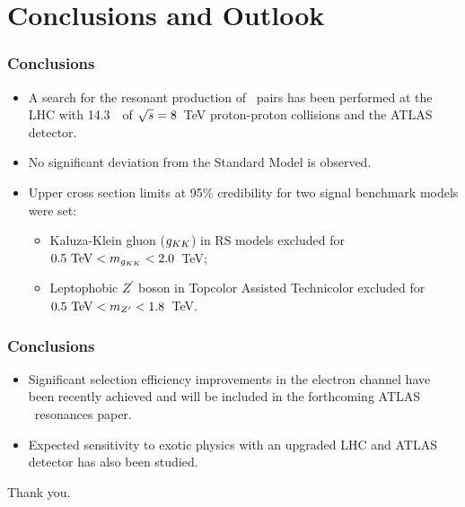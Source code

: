 \section*{Conclusions and Outlook}

\begin{frame}
    \frametitle{Conclusions}

    \begin{itemize}
    \item A search for the resonant production of \ttbar\ pairs has
        been performed at the LHC with 14.3~\ifb\ of $\sqrt{s} = 8$~TeV
        proton-proton collisions and the ATLAS detector.
    \item No significant deviation from the Standard Model is
        observed.
    \item Upper cross section limits at 95\% credibility for two
        signal benchmark models were set:
    \begin{itemize}
    \item Kaluza-Klein gluon ($g_{KK}$) in RS models excluded for
        $0.5~{\rm TeV} < m_{g_{KK}} < 2.0$~TeV\@;
    \item Leptophobic $Z^\prime$ boson in Topcolor Assisted
        Technicolor excluded for $0.5~{\rm TeV} < m_{Z^\prime} < 1.8$~TeV.
    \end{itemize}
\end{itemize}
\end{frame}

\begin{frame}
    \frametitle{Conclusions}

    \begin{itemize}
    \item Significant selection efficiency improvements in the
        electron channel have been recently achieved and will be
        included in the forthcoming ATLAS \ttbar\ resonances paper.
    \item Expected sensitivity to exotic physics with an upgraded LHC
        and ATLAS detector has also been studied.
\end{itemize}
\end{frame}

\begin{frame}[c]
\centering
\Large{Thank you.}
\end{frame}

